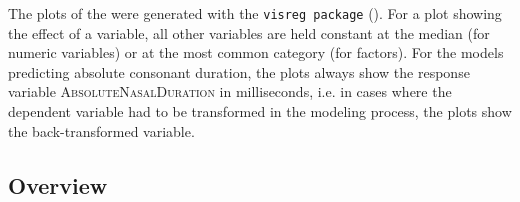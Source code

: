 The plots of the  were generated with the \texttt{visreg package} (\citealt{Breheny.2015}). For a plot showing the effect of a variable, all other variables are held constant at the median (for numeric variables) or at the most common category (for factors). For the models predicting absolute consonant duration, the plots always show the response variable \textsc{AbsoluteNasalDuration} in milliseconds, i.e. in cases where the dependent variable had to be transformed in the modeling process, the plots show the back-transformed variable.



\subsection{Overview}\label{overview corpus}



